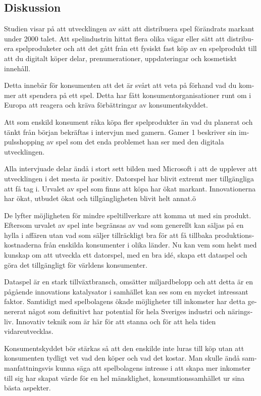 \documentclass[11p]{article}
\begin{document}
\begin{otherlanguage}{swedish}
    \section{Diskussion}

        Studien visar på att utvecklingen av sätt att distribuera spel förändrats markant under 2000 talet.
        Att spelindustrin hittat flera olika vägar eller sätt att distribuera spelproduketer och att det gått från ett fysiskt fast köp av en spelprodukt till att du digitalt köper delar, prenumerationer, uppdateringar och kosmetiskt innehåll.

        Detta innebär för konsumenten att det är svårt att veta på förhand vad du kommer att spendera på ett spel.
        Detta har fått konsumentorganisationer runt om i Europa att reagera och kräva förbättringar av konsumentskyddet.

        Att som enskild konsument råka köpa fler spelprodukter än vad du planerat och tänkt från början bekräftas i intervjun med gamern.
        Gamer 1 beskriver sin impulsshopping av spel som det enda problemet han ser med den digitala utvecklingen.

        Alla intervjuade delar ändå i stort sett bilden med Microsoft i att de  upplever att utvecklingen i det mesta är positiv. Datorspel har blivit extremt mer tillgängliga att få tag i. Urvalet av spel som finns att köpa har ökat markant. Innovationerna har ökat, utbudet ökat och tillgängligheten blivit helt annat.ö

        De lyfter möjligheten för mindre speltillverkare att komma ut med sin produkt. Eftersom urvalet av spel inte begränsas av vad som generellt kan säljas på en hylla i affären utan vad som säljer tillräckligt bra för att få tillbaka produktionskostnaderna från enskilda konsumenter i olika länder. Nu kan vem som helst med kunskap om att utveckla ett datorspel, med en bra idé, skapa ett dataspel och göra det tillgängligt för världens konsumenter.

        Dataspel är en stark tillväxtbransch, omsätter miljardbelopp och att detta är en pågående innovations katalysator i samhället kan ses som en mycket intressant faktor. Samtidigt med spelbolagens ökade möjligheter till inkomster har detta genererat något som definitivt har potential för hela Sveriges industri och näringsliv. Innovativ teknik som är här för att stanna och för att hela tiden vidareutvecklas.

        Konsumentskyddet bör stärkas så att den enskilde inte luras till köp utan att konsumenten tydligt vet vad den köper och vad det kostar.
        Man skulle ändå sammanfattningsvis kunna säga att spelbolagens intresse i att skapa mer inkomster till sig har skapat värde för en hel mänsklighet, konsumtionssamhället ur sina bästa aspekter.


\end{otherlanguage}
\end{document}
